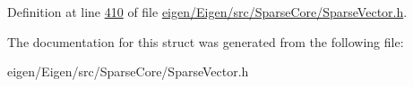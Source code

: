Definition at line \hyperlink{eigen_2_eigen_2src_2_sparse_core_2_sparse_vector_8h_source_l00410}{410} of file \hyperlink{eigen_2_eigen_2src_2_sparse_core_2_sparse_vector_8h_source}{eigen/\+Eigen/src/\+Sparse\+Core/\+Sparse\+Vector.\+h}.



The documentation for this struct was generated from the following file\+:\begin{DoxyCompactItemize}
\item 
eigen/\+Eigen/src/\+Sparse\+Core/\+Sparse\+Vector.\+h\end{DoxyCompactItemize}
